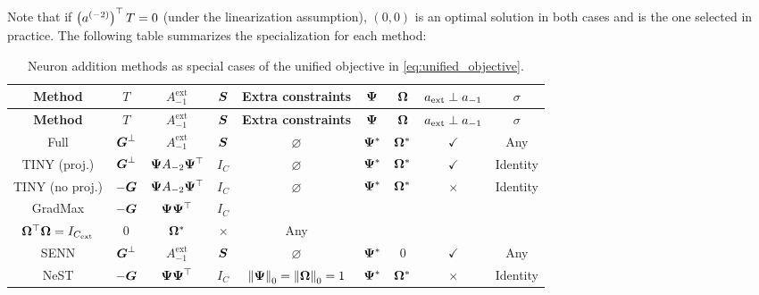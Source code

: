 \begin{theorem}
Note that if $\transp{\postact[-2]}T = 0$ (under the linearization assumption), $(0, 0)$ is an optimal solution in both cases and is the one selected in practice.
The following table summarizes the specialization for each method:
\begin{longtable}[]{@{}ccccccccc@{}}
\caption{Neuron addition methods as special cases of the unified
objective in \autoref{eq:unified_objective}.}\tabularnewline
\toprule\noalign{}
\textbf{Method} & \(T\) & \(A_{- 1}^{\text{ext}}\) & \(\covgrad\) &
\textbf{Extra constraints} & \(\Fanin{}\) & \(\Fanout{}\) &
\(\postactext \perp a_{- 1}\) & \(\sigma\) \\
\midrule\noalign{}
\endfirsthead
\toprule\noalign{}
\textbf{Method} & \(T\) & \(A_{- 1}^{\text{ext}}\) & \(\covgrad\) &
\textbf{Extra constraints} & \(\Fanin{}\) & \(\Fanout{}\) &
\(\postactext \perp a_{- 1}\) & \(\sigma\) \\
\midrule\noalign{}
\endhead
\bottomrule\noalign{}
\endlastfoot
Full & \({\Bottleneck}\) & \(A_{- 1}^{\text{ext}}\) & \(\covgrad\) &
\(\varnothing\) & \(\Fanin{}^{\ast}\) & \(\Fanout{}^{\ast}\) &
\(\checkmark\) & Any \\
TINY (proj.) & \({\Bottleneck}\) & \(\Fanin{}A_{- 2}\Fanin{}^{\top}\) &
\(I_{C}\) & \(\varnothing\) & \(\Fanin{}^{\ast}\) & \(\Fanout{}^{\ast}\)
& \(\checkmark\) & Identity \\
TINY (no proj.) & \(- \Gradpreact\) & \(\Fanin{}A_{- 2}\Fanin{}^{\top}\)
& \(I_{C}\) & \(\varnothing\) & \(\Fanin{}^{\ast}\) &
\(\Fanout{}^{\ast}\) &
\(\times\) & Identity \\
GradMax & \(- \Gradpreact\) & \(\Fanin{}\Fanin{}^{\top}\) & \(I_{C}\) &
\begin{tabular}[t]{@{}c@{}}\(\Fanin{}\Fanin{}^{\top} = I_{\cext}\) \\ \(\Fanout{}^{\top}\Fanout{} = I_{\cext}\)\end{tabular}
& \(0\) & \(\Fanout{}^{\ast}\) &
\(\times\) & Any \\
SENN & \({\Bottleneck}\) & \(A_{- 1}^{\text{ext}}\) & \(\covgrad\) &
\(\varnothing\) & \(\Fanin{}^{\ast}\) & \(0\) &
\(\checkmark\) & Any \\
NeST & \(- \Gradpreact\) & \(\Fanin{}\Fanin{}^{\top}\) & \(I_{C}\) &
\(\left\| \Fanin{} \right\|_{0} = \left\| \Fanout{} \right\|_{0} = 1\) &
\(\Fanin{}^{\ast}\) & \(\Fanout{}^{\ast}\) &
\(\times\) & Identity \\
\end{longtable}

\label{tab:comparison}


\end{theorem}
